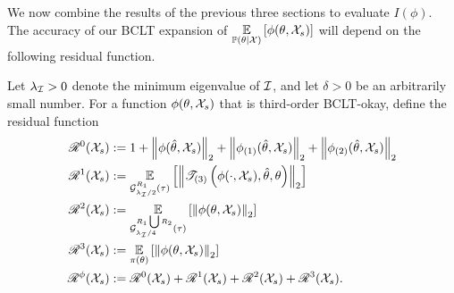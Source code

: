 
We now combine the results of the previous three sections to evaluate
$I(\phi)$.
The accuracy of our BCLT expansion of $\underset{\mathbb{P}(\theta | {\mathcal{X}})}{\mathbb{E}}\left[\phi(\theta, {\mathcal{X}}_s)\right]$ will
depend on the following residual function.
%
\begin{defn}
%
Let $\lambda_\mathcal{I} > 0$ denote the minimum eigenvalue of $\mathcal{I}$, and let $\delta > 0$
be an arbitrarily small number. For a function $\phi(\theta, {\mathcal{X}}_s)$ that
is third-order BCLT-okay, define the residual function
%
\begin{align*}
%
\resid{0}(\xvec_s) :={}&
    1 +
    \norm{\phi(\thetahat, \xvec_s)}_2 +
    \norm{\phigrad{1}(\thetahat, \xvec_s)}_2 +
    \norm{\phigrad{2}(\thetahat, \xvec_s)}_2
\\
%
\resid{1}(\xvec_s) :={}&
    \expect{\normresid{\infoev / 2}{R_1}(\tau)}{
        \norm{\tresid{3}{\phi(\cdot, \xvec_s), \thetahat, \theta}}_2}
\\
%
\resid{2}(\xvec_s) :={}&
    \expect{\normresid{\infoev / 4}{R_1 \bigcup R_2}(\tau)}{\norm{\phi(\theta, \xvec_s)}_2}
\\
%
\resid{3}(\xvec_s) :={}& \expect{\prior(\theta)}{\norm{\phi(\theta, \xvec_s)}_2}
%
\\
\resid{\phi}(\xvec_s) :={}&
    \resid{0}(\xvec_s) + \resid{1}(\xvec_s) + \resid{2}(\xvec_s) + \resid{3}(\xvec_s).
%
\end{align*}
%
\end{defn}



